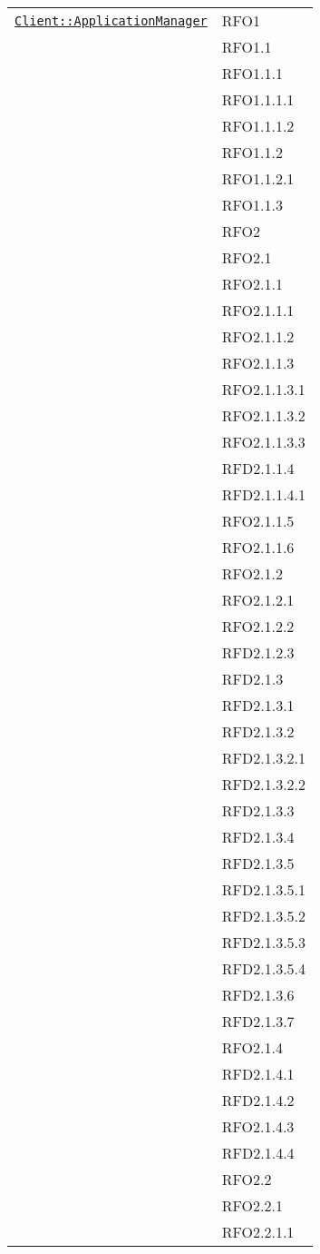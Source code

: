 \begin{longtable}{|>{\centering}m{10cm}|m{3cm}<{\centering}|}
\hyperref[Client::ApplicationManager]{\texttt{Client::ApplicationManager}} & RFO1\\
& RFO1.1\\
& RFO1.1.1\\
& RFO1.1.1.1\\
& RFO1.1.1.2\\
& RFO1.1.2\\
& RFO1.1.2.1\\
& RFO1.1.3\\
& RFO2\\
& RFO2.1\\
& RFO2.1.1\\
& RFO2.1.1.1\\
& RFO2.1.1.2\\
& RFO2.1.1.3\\
& RFO2.1.1.3.1\\
& RFO2.1.1.3.2\\
& RFO2.1.1.3.3\\
& RFD2.1.1.4\\
& RFD2.1.1.4.1\\
& RFO2.1.1.5\\
& RFO2.1.1.6\\
& RFO2.1.2\\
& RFO2.1.2.1\\
& RFO2.1.2.2\\
& RFD2.1.2.3\\
& RFD2.1.3\\
& RFD2.1.3.1\\
& RFD2.1.3.2\\
& RFD2.1.3.2.1\\
& RFD2.1.3.2.2\\
& RFD2.1.3.3\\
& RFD2.1.3.4\\
& RFD2.1.3.5\\
& RFD2.1.3.5.1\\
& RFD2.1.3.5.2\\
& RFD2.1.3.5.3\\
& RFD2.1.3.5.4\\
& RFD2.1.3.6\\
& RFD2.1.3.7\\
& RFO2.1.4\\
& RFD2.1.4.1\\
& RFD2.1.4.2\\
& RFO2.1.4.3\\
& RFD2.1.4.4\\
& RFO2.2\\
& RFO2.2.1\\
& RFO2.2.1.1\\

\end{longtable}
